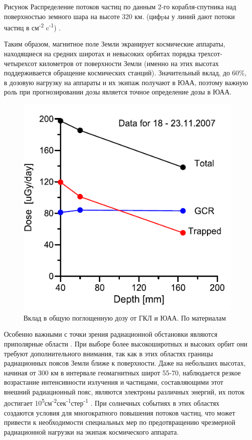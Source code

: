 Рисунок Распределение потоков частиц по данным 2-го корабля-спутника над поверхностью земного шара на высоте 320 км. (цифpы у линий дают потоки частиц в см\textsuperscript{-2} c\textsuperscript{-1}) \cite{logachev2007}.


Таким образом, магнитное поле Земли экранирует космические аппараты, находящиеся на средних широтах и невысоких орбитах порядка трехсот-четырехсот километров от поверхности Земли (именно на этих высотах поддерживается обращение космических станций). Значительный вклад, до 60\%,  в дозовую нагрузку на аппараты и их экипаж получают в ЮАА, поэтому важную роль  при прогнозировании дозы является точное определение дозы в ЮАА\cite{lish2014, Lishnevskii2012}.

\begin{figure}
	\centering
	\includegraphics[width=0.7\linewidth]{images/liulinGCRSAA}
	\caption{Вклад в общую поглощенную дозу от ГКЛ и ЮАА. По материалам  \cite{Dachev2015}}
	\label{fig:liulingcrsaa}
\end{figure}

Особенно важными с точки зрения радиационной обстановки являются приполярные области \cite{gorchakov1961}. При выборе более высокоширотных и высоких орбит они требуют дополнительного внимания, так как в этих областях границы радиационных поясов Земли ближе к поверхности. Даже на небольших высотах, начиная от 300 км в интервале геомагнитных широт 55-70, наблюдается резкое возрастание интенсивности излучения и частицами, составляющими этот внешний радиационный пояс, являются электроны различных энергий, их поток достигает 10\textsuperscript{5}см\textsuperscript{-2}сек\textsuperscript{-1}стер\textsuperscript{-1} \cite{vernov1960}. При солнечных событиях в этих областях создаются условия для многократного повышения потоков частиц, что может привести к необходимости специальных мер по предотвращению чрезмерной радиационной нагрузки на экипаж космического аппарата.

